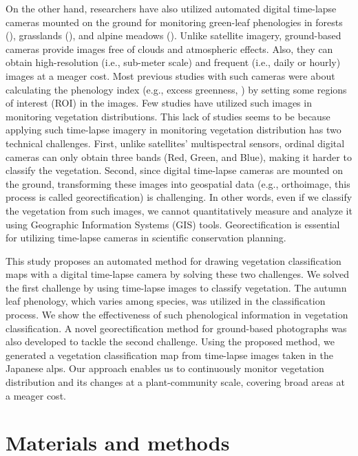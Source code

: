 \documentclass{article}
\begin{document}
On the other hand, researchers have also utilized automated digital time-lapse cameras mounted on the ground for monitoring green-leaf phenologies in forests (\cite{Richardson2009EcolAppl}), grasslands (\cite{Browning2017RemSen}), and alpine meadows (\cite{IdeOguma2013EcolInfom}). Unlike satellite imagery, ground-based cameras provide images free of clouds and atmospheric effects. Also, they can obtain high-resolution (i.e., sub-meter scale) and frequent (i.e., daily or hourly) images at a meager cost. Most previous studies with such cameras were about calculating the phenology index (e.g., excess greenness, \cite{Woebbecke1995ASAE}) by setting some regions of interest (ROI) in the images. Few studies have utilized such images in monitoring vegetation distributions. This lack of studies seems to be because applying such time-lapse imagery in monitoring vegetation distribution has two technical challenges. First, unlike satellites' multispectral sensors, ordinal digital cameras can only obtain three bands (Red, Green, and Blue), making it harder to classify the vegetation. Second, since digital time-lapse cameras are mounted on the ground, transforming these images into geospatial data (e.g., orthoimage, this process is called georectification) is challenging. In other words, even if we classify the vegetation from such images, we cannot quantitatively measure and analyze it using Geographic Information Systems (GIS) tools. Georectification is essential for utilizing time-lapse cameras in scientific conservation planning.

This study proposes an automated method for drawing vegetation classification maps with a digital time-lapse camera by solving these two challenges. We solved the first challenge by using time-lapse images to classify vegetation. The autumn leaf phenology, which varies among species, was utilized in the classification process. We show the effectiveness of such phenological information in vegetation classification. A novel georectification method for ground-based photographs was also developed to tackle the second challenge. Using the proposed method, we generated a vegetation classification map from time-lapse images taken in the Japanese alps. Our approach enables us to continuously monitor vegetation distribution and its changes at a plant-community scale, covering broad areas at a meager cost.

\hypertarget{materials-and-methods}{%
\section{Materials and methods}\label{materials-and-methods}}
\end{document}
